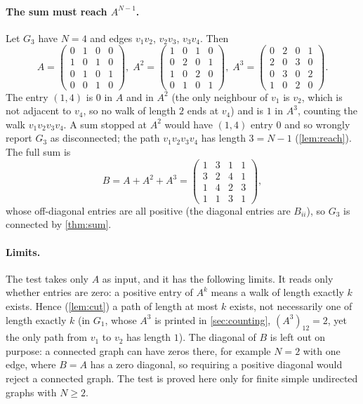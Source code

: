 \paragraph{The sum must reach $A^{N-1}$.} Let $G_3$ have $N=4$ and edges $v_1v_2$, $v_2v_3$, $v_3v_4$. Then
\[
A=\begin{pmatrix}0&1&0&0\\1&0&1&0\\0&1&0&1\\0&0&1&0\end{pmatrix},\;
A^2=\begin{pmatrix}1&0&1&0\\0&2&0&1\\1&0&2&0\\0&1&0&1\end{pmatrix},\;
A^3=\begin{pmatrix}0&2&0&1\\2&0&3&0\\0&3&0&2\\1&0&2&0\end{pmatrix}.
\]
The entry $(1,4)$ is $0$ in $A$ and in $A^2$ (the only neighbour of $v_1$ is $v_2$, which is not adjacent to $v_4$, so no walk of length $2$ ends at $v_4$) and is $1$ in $A^3$, counting the walk $v_1v_2v_3v_4$. A sum stopped at $A^2$ would have $(1,4)$ entry $0$ and so wrongly report $G_3$ as disconnected; the path $v_1v_2v_3v_4$ has length $3=N-1$ (\cref{lem:reach}). The full sum is
\[
B=A+A^2+A^3=\begin{pmatrix}1&3&1&1\\3&2&4&1\\1&4&2&3\\1&1&3&1\end{pmatrix},
\]
whose off-diagonal entries are all positive (the diagonal entries are $B_{ii}$), so $G_3$ is connected by \cref{thm:sum}.

\paragraph{Limits.} The test takes only $A$ as input, and it has the following limits. It reads only whether entries are zero: a positive entry of $A^k$ means a walk of length exactly $k$ exists. Hence (\cref{lem:cut}) a path of length at most $k$ exists, not necessarily one of length exactly $k$ (in $G_1$, whose $A^3$ is printed in \cref{sec:counting}, $(A^3)_{12}=2$, yet the only path from $v_1$ to $v_2$ has length $1$). The diagonal of $B$ is left out on purpose: a connected graph can have zeros there, for example $N=2$ with one edge, where $B=A$ has a zero diagonal, so requiring a positive diagonal would reject a connected graph. The test is proved here only for finite simple undirected graphs with $N\ge2$.
